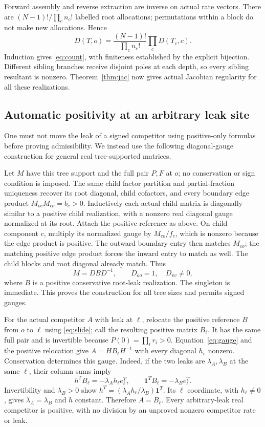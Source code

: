 \documentclass[11pt]{article}
\theoremstyle{remark}
\newcommand{\1}{\mathbf 1}
\begin{document}
Forward assembly and reverse extraction are inverse on actual rate vectors.
There are $(N-1)!/\prod_c n_c!$ labelled root allocations; permutations within
a block do not make new allocations. Hence
\[
 D(T,o)=\frac{(N-1)!}{\prod_c n_c!}\prod_c D(T_c,c).
\]
Induction gives \eqref{eq:count}, with finiteness established by the explicit
bijection. Different sibling branches receive disjoint poles at each depth,
so every sibling resultant is nonzero. Theorem~\ref{thm:jac} now gives
actual Jacobian regularity for all these realizations.

\subsection{Automatic positivity at an arbitrary leak site}
One must not move the leak of a signed competitor using positive-only
formulas before proving admissibility. We instead use the following
diagonal-gauge construction for general real tree-supported matrices.

Let $M$ have this tree support and the full pair $P,F$ at $o$; no conservation
or sign condition is imposed. The same child factor partition and
partial-fraction uniqueness recover its root diagonal, child cofactors,
and every boundary edge product $M_{oc}M_{co}=b_c>0$.
Inductively each actual child matrix is diagonally similar to a positive
child realization, with a nonzero real diagonal gauge normalized at its root.
Attach the positive reference as above. On child component $c$, multiply
its normalized gauge by $M_{co}/f_c$, which is nonzero because the edge
product is positive. The outward boundary entry then matches $M_{co}$;
the matching positive edge product forces the inward entry to match as well.
The child blocks and root diagonal already match. Thus
\begin{equation}\label{eq:gauge}
 M=DBD^{-1},\qquad D_{oo}=1,\quad D_{vv}\ne0,
\end{equation}
where $B$ is a positive conservative root-leak realization. The singleton
is immediate. This proves the construction for all tree sizes and permits
signed gauges.

For the actual competitor $A$ with leak at $\ell$, relocate the positive
reference $B$ from $o$ to $\ell$ using \eqref{eq:slide}; call the resulting
positive matrix $B_\ell$. It has the same full pair and is invertible
because $P(0)=\prod_i r_i>0$. Equation~\eqref{eq:gauge} and the positive
relocation give $A=H B_\ell H^{-1}$ with every diagonal $h_v$ nonzero.
Conservation determines this gauge. Indeed, if the two leaks are
$\lambda_A,\lambda_B$ at the same $\ell$, their column sums imply
\[
 h^T B_\ell=-\lambda_A h_\ell e_\ell^T,\qquad
 \1^TB_\ell=-\lambda_B e_\ell^T.
\]
Invertibility and $\lambda_B>0$ show
$h^T=(\lambda_Ah_\ell/\lambda_B)\1^T$.
Its $\ell$ coordinate, with $h_\ell\ne0$, gives
$\lambda_A=\lambda_B$ and $h$ constant. Therefore $A=B_\ell$.
Every arbitrary-leak real competitor is positive, with no division by an
unproved nonzero competitor rate or leak.
\end{document}
